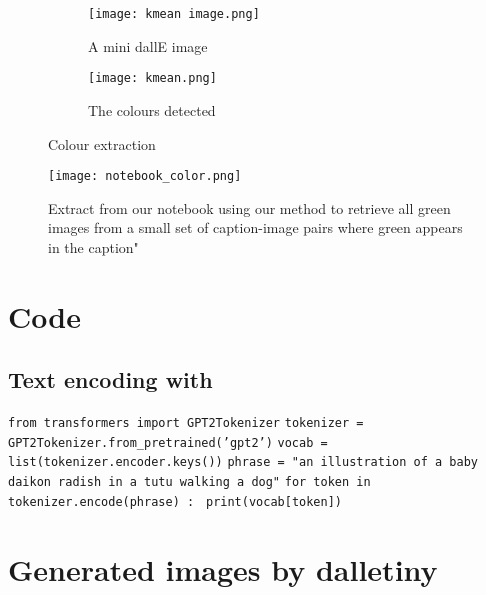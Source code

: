 \documentclass{article}
\begin{document}
\begin{appendix}
\begin{figure}[H]
\begin{subfigure}{.5\textwidth}
  \centering
  \texttt{[image: kmean image.png]}
  \caption{A mini dallE image}
  \label{fig:sfig_kmean_image}
\end{subfigure}%
\begin{subfigure}{.5\textwidth}
  \centering
  \texttt{[image: kmean.png]}
  \caption{The colours detected}
  \label{fig:sfig_kmean}
\end{subfigure}
\caption{Colour extraction}
\label{fig:kmean}
\end{figure}

\begin{figure}[H]
    \centering
    \texttt{[image: notebook\_color.png]}
    \caption{Extract from our notebook using our method to retrieve all green images from a small set of caption-image pairs where green appears in the caption"}
    \label{fig:nb_color}
\end{figure}



\section{Code}

\subsection{Text encoding with } \label{textencoding}

\texttt{from transformers import GPT2Tokenizer} \newline
\texttt{tokenizer = GPT2Tokenizer.from_pretrained('gpt2')} \newline
\texttt{vocab     = list(tokenizer.encoder.keys())} \newline 
\texttt{phrase    = "an illustration of a baby daikon radish in a tutu walking a dog"} \newline 
\texttt{for token in tokenizer.encode(phrase) :} \newline 
\texttt{    print(vocab[token])} \newline

\pagebreak

\section{Generated images by \gls{dalletiny}}\label{section:imagedalletiny}


\end{appendix}
\end{document}
